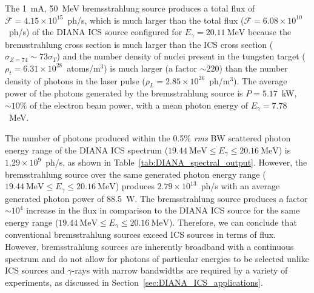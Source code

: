 \documentclass[../main.tex]{subfiles}
\begin{document}
The 1~\si{\milli\ampere}, 50~\si{\mega\electronvolt} bremsstrahlung source produces a total flux of $\mathcal{F} = 4.15\times 10^{15}$~ph/\si{\second}, which is much larger than the total flux ($\mathcal{F} = 6.08\times 10^{10}$~ph/\si{\second}) of the DIANA ICS source configured for $E_{\gamma} = 20.11~\si{\mega\electronvolt}$ because the bremsstrahlung cross section is much larger than the ICS cross section ($\sigma_{Z = 74} \sim 73\sigma_{T}$) and the number density of nuclei present in the tungsten target ($\rho_{t} = 6.31\times 10^{28}$~atoms/\si{\meter}$^{3}$) is much larger (a factor $\sim 220$) than the number density of photons in the laser pulse ($\rho_{L} = 2.85\times 10^{26}$~ph/\si{\meter}$^{3}$). The average power of the photons generated by the bremsstrahlung source is $P = 5.17$~\si{\kilo\watt}, $\sim 10$\% of the electron beam power, with a mean photon energy of $E_{\gamma} = 7.78$~\si{\mega\electronvolt}.

The number of photons produced within the 0.5\% \textit{rms} BW scattered photon energy range of the DIANA ICS spectrum ($19.44~\mathrm{\si{\mega\electronvolt}} \leq E_{\gamma} \leq 20.16~\mathrm{\si{\mega\electronvolt}}$) is $1.29\times 10^{9}$~ph/\si{\second}, as shown in Table~\ref{tab:DIANA_spectral_output}. However, the bremsstrahlung source over the same generated photon energy range ($19.44~\mathrm{\si{\mega\electronvolt}} \leq E_{\gamma} \leq 20.16~\mathrm{\si{\mega\electronvolt}}$) produces $2.79\times 10^{13}$~ph/\si{\second} with an average generated photon power of 88.5~\si{\watt}. The bremsstrahlung source produces a factor $\sim10^{4}$ increase in the flux in comparison to the DIANA ICS source for the same energy range ($19.44~\mathrm{\si{\mega\electronvolt}} \leq E_{\gamma} \leq 20.16~\mathrm{\si{\mega\electronvolt}}$). Therefore, we can conclude that conventional bremsstrahlung sources exceed ICS sources in terms of flux. However, bremsstrahlung sources are inherently broadband with a continuous spectrum and do not allow for photons of particular energies to be selected unlike ICS sources and $\gamma$-rays with narrow bandwidths are required by a variety of experiments, as discussed in Section~\ref{sec:DIANA_ICS_applications}. 

\end{document}
